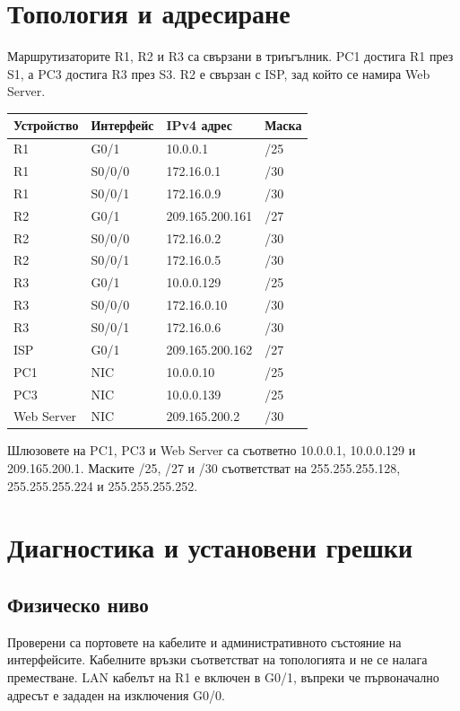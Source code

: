 \documentclass[12pt]{article}
\begin{document}
\section{Топология и адресиране}
Маршрутизаторите R1, R2 и R3 са свързани в триъгълник. PC1 достига R1 през S1, а PC3 достига R3 през S3. R2 е свързан с ISP, зад който се намира Web Server.

\begin{center}\small
\begin{longtable}{llll}
\toprule Устройство & Интерфейс & IPv4 адрес & Маска \\\midrule
R1 & G0/1 & 10.0.0.1 & /25 \\
R1 & S0/0/0 & 172.16.0.1 & /30 \\
R1 & S0/0/1 & 172.16.0.9 & /30 \\
R2 & G0/1 & 209.165.200.161 & /27 \\
R2 & S0/0/0 & 172.16.0.2 & /30 \\
R2 & S0/0/1 & 172.16.0.5 & /30 \\
R3 & G0/1 & 10.0.0.129 & /25 \\
R3 & S0/0/0 & 172.16.0.10 & /30 \\
R3 & S0/0/1 & 172.16.0.6 & /30 \\
ISP & G0/1 & 209.165.200.162 & /27 \\
PC1 & NIC & 10.0.0.10 & /25 \\
PC3 & NIC & 10.0.0.139 & /25 \\
Web Server & NIC & 209.165.200.2 & /30 \\\bottomrule
\end{longtable}\end{center}
Шлюзовете на PC1, PC3 и Web Server са съответно 10.0.0.1, 10.0.0.129 и 209.165.200.1. Маските /25, /27 и /30 съответстват на 255.255.255.128, 255.255.255.224 и 255.255.255.252.

\section{Диагностика и установени грешки}
\subsection{Физическо ниво}
Проверени са портовете на кабелите и административното състояние на интерфейсите. Кабелните връзки съответстват на топологията и не се налага преместване. LAN кабелът на R1 е включен в G0/1, въпреки че първоначално адресът е зададен на изключения G0/0.
\end{document}
